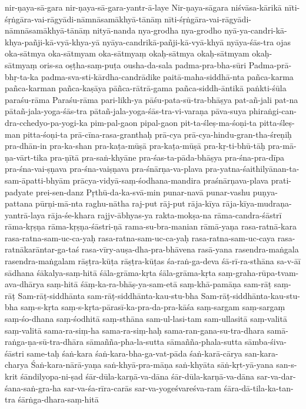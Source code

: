 {nir-ṇaya-sā-gara
nir-ṇaya-sā-gara-yantr-ā-laye
Nir-ṇaya-sāgara
niśvāsa-kārikā
nīti-śṛṅgāra-vai-rāgyādi-nāmnāsamākhyā-tānāṃ
nīti-śṛṅgāra-vai-rāgyādi-nāmnāsamākhyā-tānāṃ
nityā-nanda
nya-grodha
nya-grodho
nyā-ya-candri-kā-khya-pañji-kā-vyā-khya-yā
nyāya-candrikā-pañji-kā-vyā-khyā
nyāya-śās-tra
ojas
oka-sātmya
oka-sātmyam
oka-sātmyaṃ
okaḥ-sātmya
okaḥ-sātmyam
okaḥ-sātmyaṃ
oris-sa
oṣṭha-saṃ-puṭa
ousha-da-sala
padma-pra-bha-sūri
Padma-prā-bhṛ-ta-ka
padma-sva-sti-kārdha-candrādike
paitā-maha-siddhā-nta
pañca-karma
pañca-karman
pañca-kaṣāya
pāñca-rātrā-gama
pañca-siddh-āntikā
paṅkti-śūla
paraśu-rāma
Paraśu-rāma
pari-likh-ya
pāśu-pata-sū-tra-bhāṣya
pat-añ-jali
pat-na
pātañ-jala-yoga-śās-tra
pātañ-jala-yoga-śās-tra-vi-varaṇa
pāva-suya
phiraṅgi-can-dra-cchedyo-pa-yogi-ka
pim-pal-gaon
pipal-gaon
pit-ta-śleṣ-ma-śoṇi-ta
pitta-śleṣ-man
pitta-śoṇi-ta
prā-cīna-rasa-granthaḥ
prā-cya
prā-cya-hindu-gran-tha-śreṇiḥ
pra-dhān-in
pra-ka-shan
pra-kaṭa-mūṣā
pra-kaṭa-mūṣā
pra-kṛ-ti-bhū-tāḥ
pra-mā-ṇa-vārt-tika
pra-ṇītā
pra-saṅ-khyāne
pra-śas-ta-pāda-bhāṣya
pra-śna-pra-dīpa
pra-śna-vai-ṣṇava
pra-śna-vaiṣṇava
pra-śnārṇa-va-plava
pra-yatna-śaithilyānan-ta-sam-āpatti-bhyām
prācya-vidyā-saṃ-śodhana-mandira
praśnārṇava-plava
prati-padyate
prei-sen-danz
Pṛthū-da-ka-svā-min
punar-navā
punar-vashu
puṇya-pattana
pūrṇi-mā-nta
raghu-nātha
raj-put
rāj-put
rāja-kīya
rāja-kīya-mudraṇa-yantrā-laya
rāja-śe-khara
rajjv-ābhyas-ya
rakta-mokṣa-na
rāma-candra-śāstrī
rāma-kṛṣṇa
rāma-kṛṣṇa-śāstri-ṇā
rama-su-bra-manian
rāmā-yaṇa
rasa-ratnā-kara
rasa-ratna-sam-uc-ca-yaḥ
rasa-ratna-sam-uc-ca-yaḥ
rasa-ratna-sam-uc-caya
rasa-ratnākarāntar-ga-taś
rasa-vīry-auṣa-dha-pra-bhāvena
rasā-yana
rasendra-maṅgala
rasendra-maṅgalam
rāṣṭra-kūṭa
rāṣṭra-kūṭas
śa-raṅ-ga-deva
śā-rī-ra-sthāna
sa-v-āī
sādhana
śākalya-saṃ-hitā
śāla-grāma-kṛta
śāla-grāma-kṛta
saṃ-graha-rūpa-tvam-ava-dhārya
saṃ-hitā
śāṃ-ka-ra-bhāṣ-ya-sam-etā
saṃ-khā-pamāṇa
sam-rāṭ
saṃ-rāṭ
Sam-rāṭ-siddhānta
sam-rāṭ-siddhānta-kau-stu-bha
Sam-rāṭ-siddhānta-kau-stu-bha
saṃ-s-kṛta
saṃ-s-kṛta-pārasī-ka-pra-da-pra-kāśa
saṃ-sargam
saṃ-sargaṃ
saṃ-śo-dhana
saṃ-śodhitā
saṃ-sthāna
sam-ul-lasi-tam
sam-ullasitā
saṃ-valitā
saṃ-valitā
sama-ra-siṃ-ha
sama-ra-siṃ-haḥ
sama-ran-gana-su-tra-dhara
samā-raṅga-ṇa-sū-tra-dhāra
sāmañña-pha-la-sutta
sāmañña-phala-sutta
sāmba-śiva-śāstri
same-taḥ
śaṅ-kara
śaṅ-kara-bha-ga-vat-pāda
śaṅ-karā-cārya
san-kara-charya
Śaṅ-kara-nārā-yaṇa
saṅ-khyā-pra-māṇa
saṅ-khyāta
sāṅ-kṛt-yā-yana
san-s-krit
śāndilyopa-ni-ṣad
śār-dūla-karṇā-va-dāna
śār-dūla-karṇā-va-dāna
sar-va-dar-śana-saṅ-gra-ha
sar-va-śa-rīra-carās
sar-va-yogeśvareśva-ram
śāra-dā-tila-ka-tan-tra
śārṅga-dhara-saṃ-hitā
}
